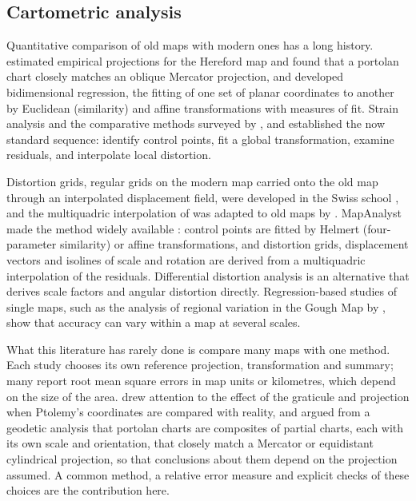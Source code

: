 \documentclass[11pt,a4paper]{article}
\begin{document}
\subsection{Cartometric analysis}
Quantitative comparison of old maps with modern ones has a long history. \citet{tobler1966} estimated empirical projections for the Hereford map and found that a portolan chart closely matches an oblique Mercator projection, and \citet{tobler1994} developed bidimensional regression, the fitting of one set of planar coordinates to another by Euclidean (similarity) and affine transformations with measures of fit. Strain analysis \citep{boutoura1986} and the comparative methods surveyed by \citet{boutoura2006}, \citet{livieratos2006} and \citet{balletti2006} established the now standard sequence: identify control points, fit a global transformation, examine residuals, and interpolate local distortion.

Distortion grids, regular grids on the modern map carried onto the old map through an interpolated displacement field, were developed in the Swiss school \citep{forstner1998}, and the multiquadric interpolation of \citet{hardy1971} was adapted to old maps by \citet{beineke2001}. MapAnalyst made the method widely available \citep{jenny2007,jenny2011}: control points are fitted by Helmert (four-parameter similarity) or affine transformations, and distortion grids, displacement vectors and isolines of scale and rotation are derived from a multiquadric interpolation of the residuals. Differential distortion analysis \citep{claeys2016} is an alternative that derives scale factors and angular distortion directly. Regression-based studies of single maps, such as the analysis of regional variation in the Gough Map by \citet{lloyd2009}, show that accuracy can vary within a map at several scales.

What this literature has rarely done is compare many maps with one method. Each study chooses its own reference projection, transformation and summary; many report root mean square errors in map units or kilometres, which depend on the size of the area. \citet{livieratos2006graticule} drew attention to the effect of the graticule and projection when Ptolemy's coordinates are compared with reality, and \citet{nicolai2016} argued from a geodetic analysis that portolan charts are composites of partial charts, each with its own scale and orientation, that closely match a Mercator or equidistant cylindrical projection, so that conclusions about them depend on the projection assumed. A common method, a relative error measure and explicit checks of these choices are the contribution here.
\end{document}
